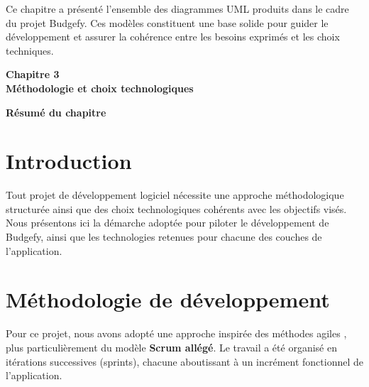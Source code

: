 \documentclass{rapportPFA}
\begin{document}
Ce chapitre a pr\'esent\'e l'ensemble des diagrammes UML produits dans le cadre du projet
Budgefy. Ces mod\`eles constituent une base solide pour guider le d\'eveloppement et assurer
la coh\'erence entre les besoins exprim\'es et les choix techniques.

\newpage
{}
{}
\vspace*{3cm}
\begin{center}
    {\Huge \textbf{Chapitre 3}}\\[0.5cm]
    {\LARGE \textbf{M\'ethodologie et choix technologiques}}
\end{center}
\vspace{2cm}

\begin{center}
    \textbf{R\'esum\'e du chapitre}
\end{center}
\begin{center}
\end{center}

\newpage
\setcounter{section}{0}
\renewcommand{\thesection}{3.\arabic{section}}

\section{Introduction}

Tout projet de d\'eveloppement logiciel n\'ecessite une approche m\'ethodologique structur\'ee
ainsi que des choix technologiques coh\'erents avec les objectifs vis\'es. Nous pr\'esentons
ici la d\'emarche adopt\'ee pour piloter le d\'eveloppement de Budgefy, ainsi que les
technologies retenues pour chacune des couches de l'application.

\section{M\'ethodologie de d\'eveloppement}

Pour ce projet, nous avons adopt\'e une approche inspir\'ee des m\'ethodes agiles \cite{agile},
plus particuli\`erement du mod\`ele \textbf{Scrum all\'eg\'e}. Le travail a \'et\'e
organis\'e en it\'erations successives (sprints), chacune aboutissant \`a un incr\'ement
fonctionnel de l'application.
\end{document}
